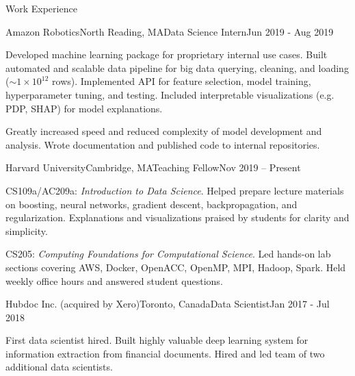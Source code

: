 \documentclass{resume} %
\begin{document}
\begin{rSection}{Work Experience}

\begin{rSubsection}{Amazon Robotics}{North Reading, MA}{Data Science Intern}{Jun 2019 - Aug 2019}

\item
    Developed machine learning package for proprietary internal use cases.
    Built automated and scalable data pipeline for big data querying, cleaning, and loading ($\sim 1 \times 10^{12}$ rows).
    Implemented API for feature selection, model training, hyperparameter tuning, and testing.
    Included interpretable visualizations (e.g. PDP, SHAP) for model explanations.

\item
    Greatly increased speed and reduced complexity of model development and analysis.
    Wrote documentation and published code to internal repositories.
    
\end{rSubsection}


\begin{rSubsection}{Harvard University}{Cambridge, MA}{Teaching Fellow}{Nov 2019 -- Present}

\item
    CS109a/AC209a: \emph{Introduction to Data Science}. Helped prepare lecture materials on boosting, neural networks, gradient descent, backpropagation, and regularization.
    Explanations and visualizations praised by students for clarity and simplicity.
    
\item
    CS205: \emph{Computing Foundations for Computational Science}. Led hands-on lab sections covering AWS, Docker, OpenACC, OpenMP, MPI, Hadoop, Spark. Held weekly office hours and answered student questions.
    
\end{rSubsection}


\begin{rSubsection}{Hubdoc Inc. (acquired by Xero)}{Toronto, Canada}{Data Scientist}{Jan 2017 - Jul 2018}
\item
    First data scientist hired.
    Built highly valuable deep learning system for information extraction from financial documents. 
    Hired and led team of two additional data scientists.


\end{rSubsection}
\end{rSection}
\end{document}
